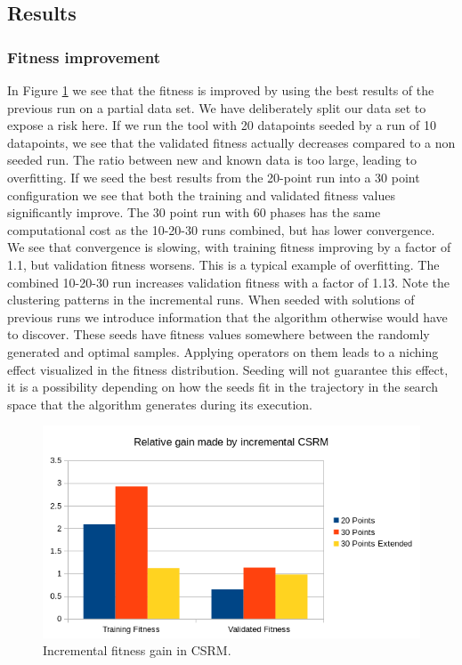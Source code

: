 \subsection{Results}
\subsubsection{Fitness improvement}
In Figure \ref{fig:incrementalgain} we see that the fitness is improved by using the best results of the previous run on a partial data set. We have deliberately split our data set to expose a risk here. If we run the tool with 20 datapoints seeded by a run of 10 datapoints, we see that the validated fitness actually decreases compared to a non seeded run. The ratio between new and known data is too large, leading to overfitting. If we seed the best results from the 20-point run into a 30 point configuration we see that both the training and validated fitness values significantly improve. 
The 30 point run with 60 phases has the same computational cost as the 10-20-30 runs combined, but has lower convergence. We see that convergence is slowing, with training fitness improving by a factor of 1.1, but validation fitness worsens. This is a typical example of overfitting. The combined 10-20-30 run increases validation fitness with a factor of 1.13. Note the clustering patterns in the incremental runs. When seeded with solutions of previous runs we introduce information that the algorithm otherwise would have to discover. These seeds have fitness values somewhere between the randomly generated and optimal samples. Applying operators on them leads to a niching effect visualized in the fitness distribution. Seeding will not guarantee this effect, it is a possibility depending on how the seeds fit in the trajectory in the search space that the algorithm generates during its execution.
\begin{figure}
    \centering
    \includegraphics[width=\textwidth,height=\textheight,keepaspectratio]{figures/incrementalgain.png}
    \caption{Incremental fitness gain in CSRM.}
    \label{fig:incrementalgain}
\end{figure}
